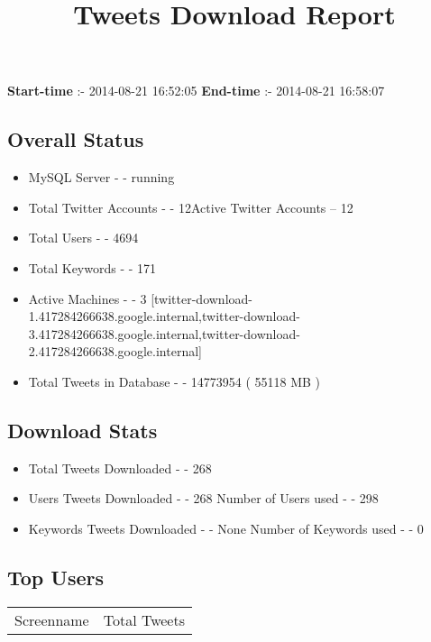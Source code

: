 \documentclass{article}\usepackage[T1]{fontenc}
\begin{document}
\title{\textbf{Tweets Download Report}}
               \date{}
                \maketitle
               \centerline{\textbf{Start-time} :- 2014-08-21 16:52:05 \hspace{40pt} \textbf{End-time} :- 2014-08-21 16:58:07}               \subsection*{Overall Status}                \begin{itemize}                \item MySQL Server - - running               \item Total Twitter Accounts - - 12\newline Active Twitter Accounts -- 12               \item Total Users - - 4694               \item Total Keywords - - 171               \item Active Machines - - 3 [twitter-download-1.417284266638.google.internal,twitter-download-3.417284266638.google.internal,twitter-download-2.417284266638.google.internal]               \item Total Tweets in Database - - 14773954 ( 55118 MB )               \end{itemize}               \subsection*{Download Stats}                \begin{itemize}                \item Total Tweets Downloaded - - 268               \item Users Tweets Downloaded - - 268 \newline Number of Users used - - 298               \item Keywords Tweets Downloaded - - None \newline Number of Keywords used - - 0              \end{itemize}              \subsection*{Top Users}\begin{tabular}{|c|c|}         \hline         Screenname & Total Tweets \\ 

\end{tabular}
\end{document}
